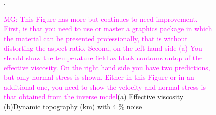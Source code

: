 \documentclass[12pt]{article}
\newcommand{\mgnote}[1]{\textcolor{magenta}{MG: #1}}
\begin{document}
\begin{figure}[H]
\centering
{}
\caption{\mgnote{This Figure has more but continues to need improvement. First, is that you need to use or master a graphics package in which the material can be presented professionally, that is without distorting the aspect ratio. Second, on the left-hand side (a) You should show the temperature field as black contours ontop of the effective viscosity. On the right hand side you have two predictions, but only normal stress is shown. Either in this Figure or in an additional one, you need to show the velocity and normal stress is that obtained from the inverse model}(a) Effective viscosity (b)Dynamic topography (km) with 4 $\%$ noise}. 
\label{fig:viscosity}
\end{figure}
 
\end{document}

